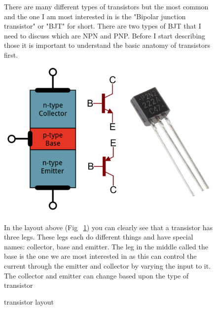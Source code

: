 \documentclass{article}
\begin{document}
\begin{figure}
    There are many different types of transistors but the most common and the one I am most interested in is
    the "Bipolar junction transistor" or "BJT" for short. There are two types of BJT that I need to discuss
    which are NPN and PNP. Before I start describing those it is important to understand the basic anatomy
    of transistors first.

    \includegraphics{pictures/transistor-layout.png}
    \caption{transistor layout} \label{fig:transistor-layout}
    \vspace{0.5cm}

    In the layout above (Fig ~\ref{fig:transistor-layout}) you can clearly see that a transistor has three legs.
    These legs each do different things and have special names: collector, base and emitter. The leg in the middle
    called the base is the one we are most interested in as this can control the current through the emitter and
    collector by varying the input to it. The collector and emitter can change based upon the type of transistor

\end{figure}
\end{document}
